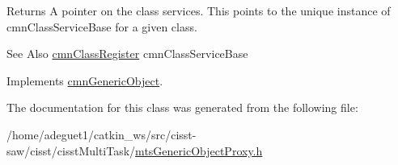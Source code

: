 \begin{DoxyReturn}{Returns}
A pointer on the class services. This points to the unique instance of cmn\-Class\-Service\-Base for a given class.
\end{DoxyReturn}
\begin{DoxySeeAlso}{See Also}
\hyperlink{classcmn_class_register}{cmn\-Class\-Register} cmn\-Class\-Service\-Base 
\end{DoxySeeAlso}


Implements \hyperlink{classcmn_generic_object_ac1e9145a0ed0711ac0c0c3edd37b673a}{cmn\-Generic\-Object}.



The documentation for this class was generated from the following file\-:\begin{DoxyCompactItemize}
\item 
/home/adeguet1/catkin\-\_\-ws/src/cisst-\/saw/cisst/cisst\-Multi\-Task/\hyperlink{mts_generic_object_proxy_8h}{mts\-Generic\-Object\-Proxy.\-h}\end{DoxyCompactItemize}
